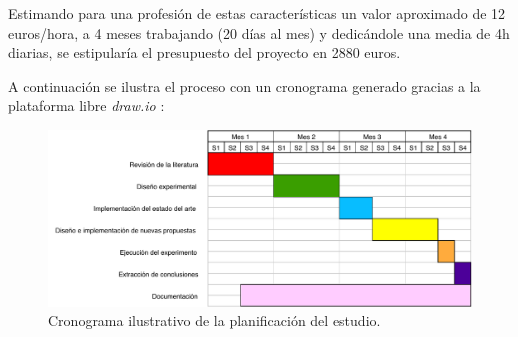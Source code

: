 Estimando para una profesión de estas características un valor aproximado de 12 euros/hora, a 4 meses trabajando (20 días al mes) y dedicándole una media de 4h diarias, se estipularía el presupuesto del proyecto en 2880 euros.

A continuación se ilustra el proceso con un cronograma generado gracias a la plataforma libre \textit{draw.io} \cite{draw.io}:

\begin{figure}[H]
	\centering
	\includegraphics[scale=0.6]{imagenes/cronograma.pdf}
	\caption{Cronograma ilustrativo de la planificación del estudio.}
	\label{cronograma}
\end{figure}
